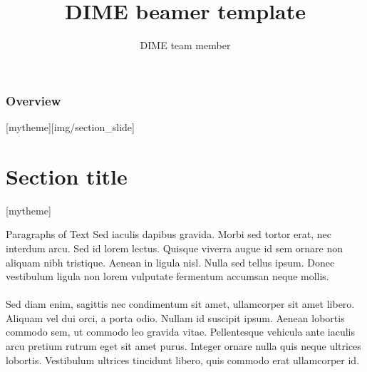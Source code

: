 \documentclass[aspectratio=169]{beamer}
\title{DIME beamer template}
\date{}
\author{DIME team member} %
\institute{Development Impact Evaluation (DIME) \newline The World Bank }
\newcommand{\sectionpic}[2]{
	\setbeamertemplate{section page}[mytheme][#2]
	\section{#1}
	\setbeamertemplate{section page}[mytheme]
}
\begin{document}
	
	
	{
		\maketitle
	}

\begin{frame}
	\frametitle{Overview} %
	\tableofcontents %
\end{frame}

\sectionpic{Section title}{img/section_slide}

\begin{frame}{Paragraphs of Text}
	Sed iaculis dapibus gravida. Morbi sed tortor erat, nec interdum arcu. Sed id lorem lectus. Quisque viverra augue id sem ornare non aliquam nibh tristique. Aenean in ligula nisl. Nulla sed tellus ipsum. Donec vestibulum ligula non lorem vulputate fermentum accumsan neque mollis.\\~\\
	
	Sed diam enim, sagittis nec condimentum sit amet, ullamcorper sit amet libero. Aliquam vel dui orci, a porta odio. Nullam id suscipit ipsum. Aenean lobortis commodo sem, ut commodo leo gravida vitae. Pellentesque vehicula ante iaculis arcu pretium rutrum eget sit amet purus. Integer ornare nulla quis neque ultrices lobortis. Vestibulum ultrices tincidunt libero, quis commodo erat ullamcorper id.
\end{frame}
\end{document}
